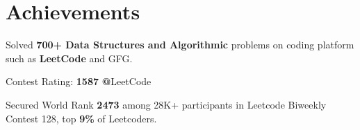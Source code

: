 \section{Achievements}
\small{
    \resumeItemListStart
       \item {Solved \textbf{700+ Data Structures and Algorithmic} problems on coding platform such as \textbf{LeetCode} and GFG.}
        \item{Contest Rating:} {\textbf{1587} \textbf{@}LeetCode}
        \item {Secured World Rank \textbf{2473} among 28K+ participants in Leetcode Biweekly Contest 128, top \textbf{9\%} of Leetcoders.}
    \resumeItemListEnd
}